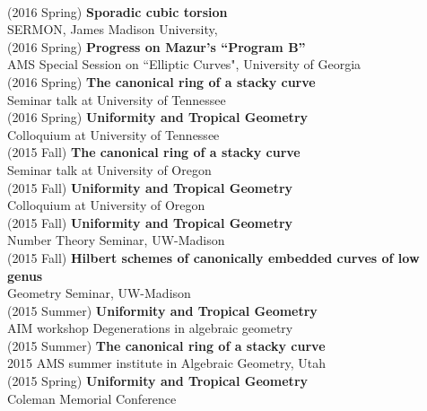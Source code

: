 \documentclass[margin,line]{res}
\begin{document}
\begin{resume}
\vspace{.05cm}\\
(2016 Spring) \textbf{Sporadic cubic torsion}\\  
SERMON, James Madison University, 
\vspace{.05cm}\\
(2016 Spring) \textbf{Progress on Mazur's ``Program B''}\\  
AMS Special Session on  ``Elliptic Curves", University of Georgia
\vspace{.05cm}\\
(2016 Spring) \textbf{The canonical ring of a stacky curve}\\  
Seminar talk at University of Tennessee
\vspace{.05cm}\\
(2016 Spring) \textbf{Uniformity and Tropical Geometry}\\
Colloquium at University of Tennessee
\vspace{.05cm}\\
(2015 Fall) \textbf{The canonical ring of a stacky curve}\\  
Seminar talk at University of Oregon
\vspace{.05cm}\\
(2015 Fall) \textbf{Uniformity and Tropical Geometry}\\
Colloquium at University of Oregon
\vspace{.05cm}\\
(2015 Fall) \textbf{Uniformity and Tropical Geometry}\\
Number Theory Seminar, UW-Madison
\vspace{.05cm}\\
(2015 Fall) \textbf{Hilbert schemes of canonically embedded curves of low genus}\\
Geometry Seminar, UW-Madison
\vspace{.05cm}\\
(2015 Summer) \textbf{Uniformity and Tropical Geometry}\\
AIM workshop Degenerations in algebraic geometry
\vspace{.05cm}\\
(2015 Summer) \textbf{The canonical ring of a stacky curve}\\  
2015 AMS summer institute in Algebraic Geometry, Utah
\vspace{.05cm}\\
(2015 Spring) \textbf{Uniformity and Tropical Geometry}\\
Coleman Memorial Conference

\end{resume}
\end{document}
